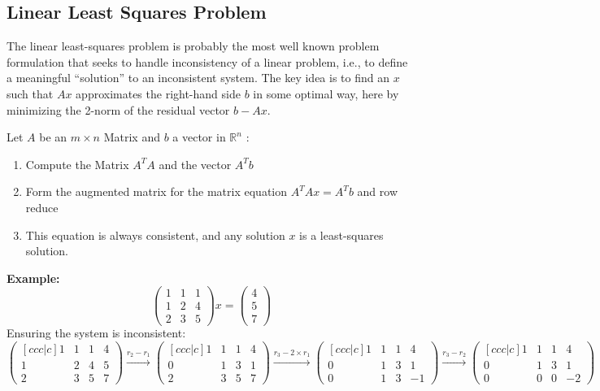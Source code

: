 \documentclass{article}
\begin{document}
					 \subsection{Linear Least Squares Problem}
				The linear least-squares problem is probably the most well known problem formulation that seeks to handle inconsistency of a linear problem, i.e., to define a meaningful “solution” to an inconsistent system. 
				\newline 
				The key idea is to find an $x$ such that $Ax$ approximates the right-hand side $b$ in some optimal way, here by minimizing the 2-norm of the residual vector $b - Ax$.
\begin{tcolorbox}[colback=seashell,colframe=beaublue,title=Recipe: Compute a least-squares solution ~\cite{recipe}]	
	Let $A$ be an $m \times n$ Matrix and $b$ a vector in $\mathbb{R}^{n}$ :  
	\begin{enumerate}
		\item Compute the Matrix $A^{T}A$ and the vector $A^{T}b$ 
		\item Form the augmented matrix for the matrix equation $A^{T}Ax = A^{T}b$ and row reduce
		\item This equation is always consistent, and any solution $x$ is a least-squares solution.
	\end{enumerate}
\end{tcolorbox}
\textbf{Example: }
	$$\begin{pmatrix} 1 & 1 & 1 \\ 1 & 2 & 4 \\ 2 & 3 & 5 \end{pmatrix}x = \begin{pmatrix} 4\\ 5 \\ 7 \end{pmatrix}$$
		Ensuring the system is inconsistent: 
		$$ \begin{pmatrix}[ccc|c] 1 & 1 & 1 & 4 \\ 1 & 2 & 4 & 5 \\ 2 & 3 & 5 & 7 \end{pmatrix} 
			\xrightarrow{r_2 - r_1}
			 \begin{pmatrix}[ccc|c] 1 & 1 & 1 & 4 \\ 0 & 1 & 3 & 1 \\ 2 & 3 & 5 & 7 \end{pmatrix}
				 \xrightarrow{r_3 - 2\times r_1}
                         \begin{pmatrix}[ccc|c] 1 & 1 & 1 & 4 \\ 0 & 1 & 3 & 1 \\ 0 & 1 & 3 & -1 \end{pmatrix}
                            \xrightarrow{r_3 - r_2}
                         \begin{pmatrix}[ccc|c] 1 & 1 & 1 & 4 \\ 0 & 1 & 3 & 1 \\ 0 & 0 & 0 & -2 \end{pmatrix} $$
\end{document}
